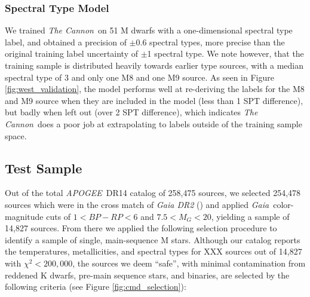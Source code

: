 \documentclass[modern]{aastex62}
\newcommand{\apogee}{\textsl{APOGEE}}
\newcommand{\thecannon}{\textsl{The Cannon}}
\newcommand{\gaia}{\textsl{Gaia}}
\begin{document}
\color{gcolor}{Some note on what lines vary significantly with parameter...}\color{black}

\color{gcolor}{HOGG: Some commentary on why $\chi^2$ is higher than expected.}\color{black}

\subsubsection{Spectral Type Model \label{subsec:west_results}}
We trained \thecannon\ on 51 M dwarfs with a one-dimensional spectral type label, and obtained a precision of $\pm$0.6 spectral types, more precise than the original training label uncertainty of $\pm$1 spectral type. We note however, that the training sample is distributed heavily towards earlier type sources, with a median spectral type of 3 and only one M8 and one M9 source. As seen in Figure \ref{fig:west_validation}, the model performs well at re-deriving the labels for the M8 and M9 source when they are included in the model (less than 1 SPT difference), but badly when left out (over 2 SPT difference), which indicates \thecannon\ does a poor job at extrapolating to labels outside of the training sample space. 

\color{gcolor}{Further assessment of the reliability of our model for late types?...}\color{black}


\subsection{Test Sample \label{subsec:test_selection}} 
Out of the total \apogee\ DR14 catalog of 258,475 sources, we selected 254,478 sources which were in the cross match of \textsl{Gaia DR2} (\citealt{Brown:2018}) and applied \gaia\ color-magnitude cuts of $1<BP-RP<6$ and $7.5<M_G<20$, yielding a sample of 14,827 sources. From there we applied the following selection procedure to identify a sample of single, main-sequence M stars. Although our catalog reports the temperatures, metallicities, and spectral types for XXX sources out of 14,827 with $\chi^2<200,000$, the sources we deem ``safe'', with minimal contamination from reddened K dwarfs, pre-main sequence stars, and binaries, are selected by the following criteria (see Figure \ref{fig:cmd_selection}):
\end{document}
